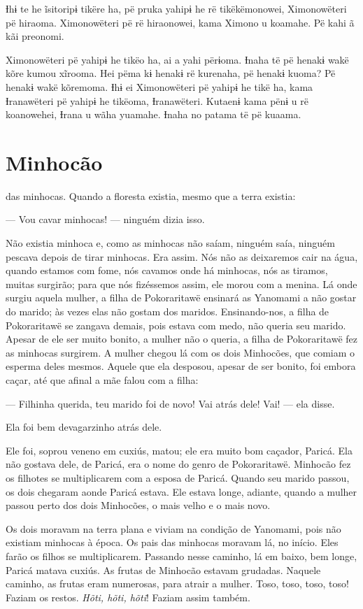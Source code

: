Ɨhɨ te he ĩsitoripɨ tikëre ha, pë pruka yahipɨ he rë tikëkëmonowei,
Ximonowëteri pë hiraoma. Ximonowëteri pë rë hiraonowei, kama Ximono u
koamahe. Pë kahi ã kãi preonomi. 

Ximonowëteri pë yahipɨ he tikëo ha, ai a yahi përɨoma. Ɨnaha të pë
henakɨ wakë kõre kumou xĩrooma. Hei pëma kɨ henakɨ rë kurenaha, pë
henakɨ kuoma? Pë henakɨ wakë kõremoma. Ɨhɨ ei Ximonowëteri pë yahipɨ he
tikë ha, kama Ɨranawëteri pë yahipɨ he tikëoma, Ɨranawëteri. Kutaenɨ
kama pënɨ u rë koanowehei, Ɨrana u wãha yuamahe. Ɨnaha no patama të pë
kuaama. 

\chapter{Minhocão}
 
 das minhocas. Quando a floresta existia, mesmo que a terra
existia: 

--- Vou cavar minhocas! --- ninguém dizia isso. 

Não existia minhoca e, como as minhocas não saíam, ninguém saía, ninguém
pescava depois de tirar minhocas. Era assim. Nós não as deixaremos cair
na água, quando estamos com fome, nós cavamos onde há minhocas, nós as
tiramos, muitas surgirão; para que nós fizéssemos assim, ele morou com a
menina. Lá onde surgiu aquela mulher, a filha de Pokoraritawë ensinará
as Yanomami a não gostar do marido;  às vezes elas não gostam dos maridos. Ensinando-nos, a filha de Pokoraritawë se zangava demais, pois
estava com medo, não queria seu marido. Apesar de ele ser muito bonito,
a mulher não o queria, a filha de Pokoraritawë fez as minhocas surgirem.
A mulher chegou lá com os dois Minhocões, que comiam o esperma deles
mesmos. Aquele que ela desposou, apesar de ser bonito, foi embora caçar,
até que afinal a mãe falou com a filha: 

--- Filhinha querida, teu marido foi de novo! Vai atrás dele! Vai! ---
ela disse. 

Ela foi bem devagarzinho atrás dele. 

Ele foi, soprou veneno em cuxiús, matou; ele era muito bom caçador,
Paricá. Ela não gostava dele, de Paricá, era o nome do genro de
Pokoraritawë. Minhocão fez os filhotes se multiplicarem com a esposa de
Paricá. Quando seu marido passou, os dois chegaram aonde Paricá estava.
Ele estava longe, adiante, quando a mulher passou perto dos dois
Minhocões, o mais velho e o mais novo. 

Os dois moravam na terra plana e viviam na condição de Yanomami, pois
não existiam minhocas à época. Os pais das minhocas moravam lá, no
início. Eles farão os filhos se multiplicarem. Passando nesse caminho, lá
em baixo, bem longe, Paricá matava cuxiús. As frutas de Minhocão estavam
grudadas. Naquele caminho, as frutas eram numerosas, para atrair a
mulher. Toso, toso, toso, toso! Faziam os restos. \textit{Hõti, hõti, hõti}!
Faziam assim também. 


